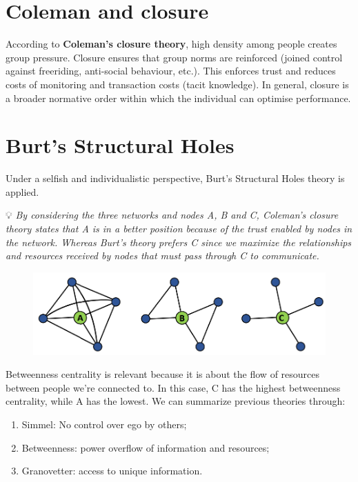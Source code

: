 \documentclass[
  notitlepage,
  onecolumn,
  openany]{book}
\providecommand{\tightlist}{%
  \setlength{\itemsep}{0pt}\setlength{\parskip}{0pt}}
\begin{document}
\hypertarget{coleman-and-closure}{%
\section{Coleman and closure}\label{coleman-and-closure}}

According to \textbf{Coleman's closure theory}, high density among people creates group pressure. Closure ensures that group norms are reinforced (joined control against freeriding, anti-social behaviour, etc.). This enforces trust and reduces costs of monitoring and transaction costs (tacit knowledge). In general, closure is a broader normative order within which the individual can optimise performance.

\hypertarget{burts-structural-holes}{%
\section{Burt's Structural Holes}\label{burts-structural-holes}}

Under a selfish and individualistic perspective, Burt's Structural Holes theory is applied.

💡 \emph{By considering the three networks and nodes A, B and C, Coleman's closure theory states that A is in a better position because of the trust enabled by nodes in the network. Whereas Burt's theory prefers C since we maximize the relationships and resources received by nodes that must pass through C to communicate.}

\begin{figure}[h!]

{\centering \includegraphics[width=0.5\linewidth]{images/07-Triads and structural holes/Untitled 2} 

}

\end{figure}

Betweenness centrality is relevant because it is about the flow of resources between people we're connected to. In this case, C has the highest betweenness centrality, while A has the lowest. We can summarize previous theories through:

\begin{enumerate}
\def\labelenumi{\arabic{enumi}.}
\tightlist
\item
  Simmel: No control over ego by others;
\item
  Betweenness: power overflow of information and resources;
\item
  Granovetter: access to unique information.
\end{enumerate}
\end{document}
